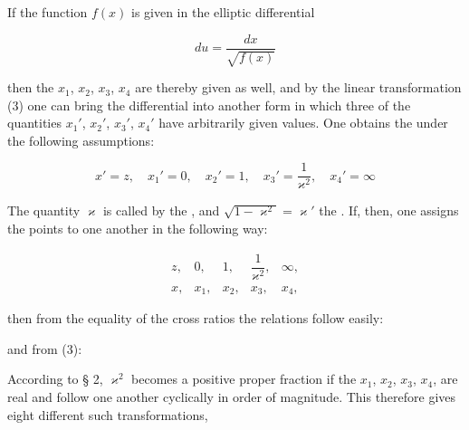 

If the function $f(x)$ is given in the elliptic differential

\[
du = \dfrac{dx}{\sqrt{f(x)}}
\]

then the $x_1$, $x_2$, $x_3$, $x_4$ are thereby given as well, and by the linear transformation (3) one can bring the differential into another form in which three of the quantities $x_1'$, $x_2'$, $x_3'$, $x_4'$ have arbitrarily given values. %
One obtains the  under the following assumptions:

\[
x' = z, \quad x_1' = 0, \quad x_2' = 1, \quad x_3' = \dfrac{1}{\varkappa^2}, \quad x_4' = \infty
\]

The quantity $\varkappa$ is called by  the , and $\sqrt{1-\varkappa^2} = \varkappa'$ the . If, then, one assigns the points to one another in the following way:

\[
\begin{array}{ccccc}
z, & 0, & 1, & \dfrac{1}{\varkappa^2}, & \infty, \\[6pt]
x, & x_1, & x_2, & x_3, & x_4,
\end{array}
\]

then from the equality of the cross ratios the relations follow easily:




and from (3):


According to § 2, $\varkappa^2$ becomes a positive proper fraction if the $x_1$, $x_2$, $x_3$, $x_4$, are real and follow one another cyclically in order of magnitude. This therefore gives eight different such transformations,
